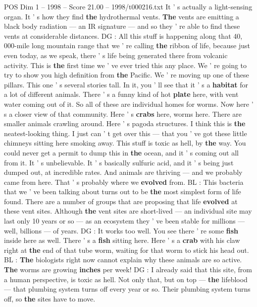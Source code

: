 \begin{textsample}{POS Dim 1 – 1998 – Score 21.00 – 1998/t000216.txt}
It ' s actually a light-sensing organ.
It ' s how they find \textbf{the} hydrothermal vents. \textbf{The} vents are emitting a black body radiation — an IR signature — and so they ' re able to find these vents at considerable distances.
DG : All this stuff is happening along that 40, 000-mile long mountain range that we ' re calling \textbf{the} ribbon of life, because just even today, as we speak, there ' s life being generated there from volcanic activity.
This is \textbf{the} first time we ' ve ever tried this any place.
We ' re going to try to show you high definition from \textbf{the} Pacific.
We ' re moving up one of these pillars.
This one ' s several stories tall.
In it, you ' ll see that it ' s a \textbf{habitat} for a lot of different animals.
There ' s a funny kind of hot \textbf{plate} here, with vent water coming out of it.
So all of these are individual homes for worms.
Now here ' s a closer view of that community.
Here ' s \textbf{crabs} here, worms here.
There are smaller animals crawling around.
Here ' s pagoda structures.
I think this is \textbf{the} neatest-looking thing.
I just can ' t get over this — that you ' ve got these little chimneys sitting here smoking away.
This stuff is toxic as hell, by \textbf{the} way.
You could never get a permit to dump this in \textbf{the} ocean, and it ' s coming out all from it.
It ' s unbelievable.
It ' s basically sulfuric acid, and it ' s being just dumped out, at incredible rates.
And animals are thriving — and we probably came from here.
That ' s probably where we \textbf{evolved} from.
BL : This bacteria that we ' ve been talking about turns out to be \textbf{the} most simplest form of life found.
There are a number of groups that are proposing that life \textbf{evolved} at these vent sites.
Although \textbf{the} vent sites are short-lived — an individual site may last only 10 years or so — as an ecosystem they ' ve been stable for millions — well, billions — of years.
DG : It works too well.
You see there ' re some \textbf{fish} inside here as well.
There ' s a \textbf{fish} sitting here.
Here ' s a \textbf{crab} with his claw right at \textbf{the} end of that tube worm, waiting for that worm to stick his head out.
BL : \textbf{The} biologists right now cannot explain why these animals are so active. \textbf{The} worms are growing \textbf{inches} per week!
DG : I already said that this site, from a human perspective, is toxic as hell.
Not only that, but on top — \textbf{the} lifeblood — that plumbing system turns off every year or so.
Their plumbing system turns off, so \textbf{the} sites have to move.

\end{textsample}
